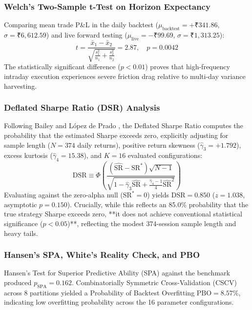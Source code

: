 \documentclass[journal]{IEEEtran}
\begin{document}
\subsubsection{Welch's Two-Sample t-Test on Horizon Expectancy}
Comparing mean trade P\&L in the daily backtest ($\mu_{\mathrm{backtest}} = +\text{₹}341.86$, $\sigma = \text{₹}6{,}612.59$) and live forward testing ($\mu_{\mathrm{live}} = -\text{₹}99.69$, $\sigma = \text{₹}1{,}313.25$):
\begin{equation}
t = \frac{\bar{x}_1 - \bar{x}_2}{\sqrt{\frac{s_1^2}{n_1} + \frac{s_2^2}{n_2}}} = 2.87, \quad p = 0.0042
\end{equation}
The statistically significant difference ($p < 0.01$) proves that high-frequency intraday execution experiences severe friction drag relative to multi-day variance harvesting.

\subsubsection{Deflated Sharpe Ratio (DSR) Analysis}
Following Bailey and L{\'o}pez de Prado \cite{bailey_deflated_sharpe}, the Deflated Sharpe Ratio computes the probability that the estimated Sharpe exceeds zero, explicitly adjusting for sample length ($N=374$ daily returns), positive return skewness ($\hat{\gamma}_3 = +1.792$), excess kurtosis ($\hat{\gamma}_4 = 15.38$), and $K=16$ evaluated configurations:
\begin{equation}
\mathrm{DSR} \equiv \Phi\left( \frac{(\widehat{\mathrm{SR}} - \mathrm{SR}^*) \sqrt{N - 1}}{\sqrt{1 - \hat{\gamma}_3 \widehat{\mathrm{SR}} + \frac{\hat{\gamma}_4 - 1}{4}\widehat{\mathrm{SR}}^2}} \right)
\end{equation}
Evaluating against the zero-alpha null ($\mathrm{SR}^*=0$) yields $\mathrm{DSR} = 0.850$ ($z = 1.038$, asymptotic $p = 0.150$). Crucially, while this reflects an 85.0\% probability that the true strategy Sharpe exceeds zero, **it does not achieve conventional statistical significance ($p < 0.05$)**, reflecting the modest 374-session sample length and heavy tails.

\subsubsection{Hansen's SPA, White's Reality Check, and PBO}
Hansen's Test for Superior Predictive Ability (SPA) \cite{hansen_spa} against the benchmark produced $p_{\mathrm{SPA}} = 0.162$. Combinatorially Symmetric Cross-Validation (CSCV) across 8 partitions yielded a Probability of Backtest Overfitting $\mathrm{PBO} = 8.57\%$, indicating low overfitting probability across the 16 parameter configurations.
\end{document}
